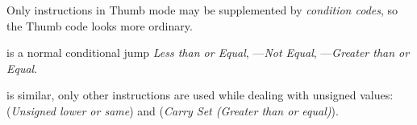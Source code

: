 
Only  instructions in Thumb mode may be supplemented by \emph{condition codes}, so the Thumb code 
looks more ordinary.

 is a normal conditional jump \emph{Less than or Equal}, 
---\emph{Not Equal}, 
---\emph{Greater than or Equal}.

 is similar, only other instructions are used while dealing 
with unsigned values:  
(\emph{Unsigned lower or same}) and  (\emph{Carry Set (Greater than or equal)}).
